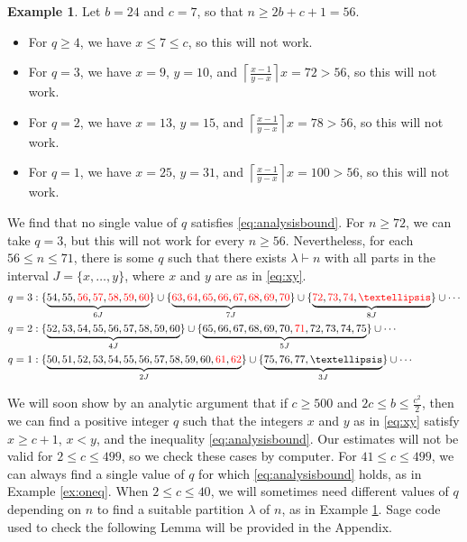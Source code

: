 \documentclass[12pt]{amsart}  %
\theoremstyle{definition}
\newtheorem{example}[theorem]{Example}
\theoremstyle{remark}
\numberwithin{equation}{section}
\begin{document}
\begin{example}\label{ex:moreq}
Let $b=24$ and $c=7$, so that $n\geq 2b+c+1=56$. 
\begin{itemize}
\item For $q\geq 4$, we have $x\leq 7\leq c$, so this will not work.
\item For $q=3$, we have $x=9$, $y=10$, and $\left\lceil\frac{x-1}{y-x}\right\rceil x=72>56$, so this will not work.
\item For $q=2$, we have $x=13$, $y=15$, and $\left\lceil\frac{x-1}{y-x}\right\rceil x=78>56$, so this will not work.
\item For $q=1$, we have $x=25$, $y=31$, and $\left\lceil\frac{x-1}{y-x}\right\rceil x=100>56$, so this will not work.
\end{itemize}
We find that no single value of $q$ satisfies \eqref{eq:analysisbound}. For $n\geq 72$, we can take $q=3$, but this will not work for every $n\geq 56$. Nevertheless, for each $56\leq n\leq 71$, there is some $q$ such that there exists $\lambda\vdash n$ with all parts in the interval $J=\{x,\ldots,y\}$, where $x$ and $y$ are as in \eqref{eq:xy}.
\begin{align*}
q=3&:\{\underbrace{54,55,\textcolor{red}{56},\textcolor{red}{57},\textcolor{red}{58},\textcolor{red}{59},\textcolor{red}{60}}_{6J}\}\cup\{\underbrace{\textcolor{red}{63},\textcolor{red}{64},\textcolor{red}{65},\textcolor{red}{66},\textcolor{red}{67},\textcolor{red}{68},\textcolor{red}{69},\textcolor{red}{70}}_{7J}\}\cup\{\underbrace{\textcolor{red}{72},\textcolor{red}{73},\textcolor{red}{74},\textcolor{red}{\ldots}}_{8J}\}\cup\cdots\\
q=2&:\{\underbrace{52,53,54,55,56,57,58,59,60}_{4J}\}\cup\{\underbrace{65,66,67,68,69,70,\textcolor{red}{71},72,73,74,75}_{5J}\}\cup\cdots\\
q=1&:\{\underbrace{50,51,52,53,54,55,56,57,58,59,60,\textcolor{red}{61},\textcolor{red}{62}}_{2J}\}\cup\{\underbrace{75,76,77,\ldots}_{3J}\}\cup\cdots
\end{align*}
\end{example}

We will soon show by an analytic argument that if $c\geq 500$ and $2c\leq b\leq\frac{c^2}2$, then we can find a positive integer $q$ such that the integers $x$ and $y$ as in \eqref{eq:xy} satisfy $x\geq c+1$, $x<y$, and the inequality \eqref{eq:analysisbound}. Our estimates will not be valid for $2\leq c\leq 499$, so we check these cases by computer. For $41\leq c\leq 499$, we can always find a single value of $q$ for which \eqref{eq:analysisbound} holds, as in Example \ref{ex:oneq}. When $2\leq c\leq 40$, we will sometimes need different values of $q$ depending on $n$ to find a suitable partition $\lambda$ of $n$, as in Example \ref{ex:moreq}. Sage code used to check the following Lemma will be provided in the Appendix.
\end{document}
